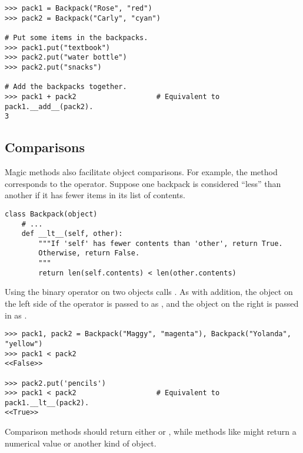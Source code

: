 \begin{lstlisting}
>>> pack1 = Backpack("Rose", "red")
>>> pack2 = Backpack("Carly", "cyan")

# Put some items in the backpacks.
>>> pack1.put("textbook")
>>> pack2.put("water bottle")
>>> pack2.put("snacks")

# Add the backpacks together.
>>> pack1 + pack2                   # Equivalent to pack1.__add__(pack2).
3
\end{lstlisting}


\subsection*{Comparisons} %

Magic methods also facilitate object comparisons.
For example, the  method corresponds to the \li{<} operator.
Suppose one backpack is considered ``less'' than another if it has fewer items in its list of contents.

\begin{lstlisting}
class Backpack(object)
    # ...
    def __lt__(self, other):
        """If 'self' has fewer contents than 'other', return True.
        Otherwise, return False.
        """
        return len(self.contents) < len(other.contents)
\end{lstlisting}

Using the \li{<} binary operator on two  objects calls .
As with addition, the object on the left side of the \li{<} operator is passed to  as , and the object on the right is passed in as .

\begin{lstlisting}
>>> pack1, pack2 = Backpack("Maggy", "magenta"), Backpack("Yolanda", "yellow")
>>> pack1 < pack2
<<False>>

>>> pack2.put('pencils')
>>> pack1 < pack2                   # Equivalent to pack1.__lt__(pack2).
<<True>>
\end{lstlisting}

Comparison methods should return either  or , while methods like  might return a numerical value or another kind of object.


